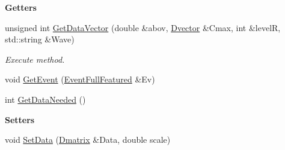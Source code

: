 \begin{Indent}\textbf{ Getters}\par
\begin{DoxyCompactItemize}
\item 
unsigned int \hyperlink{classtsa_1_1_w_d_f2_reconstruct_a59a5db57e65ecb9abf0b822f55d057af}{Get\+Data\+Vector} (double \&abov, \hyperlink{namespacetsa_a8900fb03d849baf447a1a0efe2561fb2}{Dvector} \&Cmax, int \&levelR, std\+::string \&Wave)
\begin{DoxyCompactList}\small\item\em Execute method. \end{DoxyCompactList}\item 
void \hyperlink{classtsa_1_1_w_d_f2_reconstruct_a668e1f73d039c21b0905f364be83682c}{Get\+Event} (\hyperlink{classtsa_1_1_event_full_featured}{Event\+Full\+Featured} \&Ev)
\item 
int \hyperlink{classtsa_1_1_w_d_f2_reconstruct_a39d74ac7135a6daa66bd7c2880f33215}{Get\+Data\+Needed} ()
\end{DoxyCompactItemize}
\end{Indent}
\begin{Indent}\textbf{ Setters}\par
\begin{DoxyCompactItemize}
\item 
void \hyperlink{classtsa_1_1_w_d_f2_reconstruct_a9cd78987651d392b4742f2f63df49e49}{Set\+Data} (\hyperlink{namespacetsa_ad260cd21c1891c4ed391fe788569aba4}{Dmatrix} \&Data, double scale)
\end{DoxyCompactItemize}
\end{Indent}
